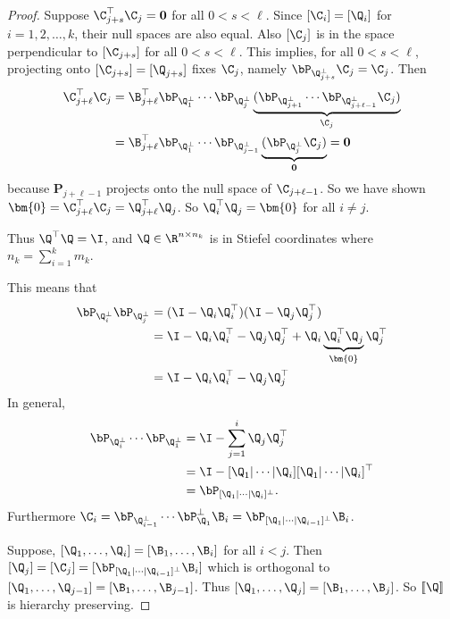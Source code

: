 \begin{proof}
        Suppose $\C_{j + s}^\top\C_j = \mathbf{0}$ for all $0 < s < \ell$. Since $[\C_i] = [\Q_i]$ for $i=1,2,\dots,k$, their null spaces are also equal. Also $[\C_j]$ is in the space perpendicular to $[\C_{j + s}]$ for all $0 < s < \ell$. This implies, for all $0 < s < \ell$, projecting onto $[\C_{j+s}] = [\Q_{j+s}]$ fixes $\C_j$, namely $\bP_{\Q_{j+s}^\perp}\C_j = \C_j$. Then
        \begin{align}
            \C_{j + \ell}^\top\C_j &= \B_{j + \ell}^\top\bP_{\Q_1^\perp} \cdots \bP_{\Q_j^\perp} \underbrace{(\bP_{\Q_{j+1}^\perp} \cdots \bP_{\Q_{j+\ell-1}^\perp}\C_j)}_{\C_j}\\
            &= \B_{j + \ell}^\top\bP_{\Q_1^\perp} \cdots \bP_{\Q_{j-1}^\perp}\underbrace{(\bP_{\Q_j^\perp} \C_j)}_{\mathbf{0}} = \mathbf{0}
        \end{align}
        because $\mathbf{P}_{j+\ell -1}$ projects onto the null space of $\C_{j+\ell - 1}$. So we have shown $\bm{0} = \C_{j + \ell}^\top\C_j = \Q_{j + \ell}^\top\Q_j$. So $\Q_i^\top \Q_j = \bm{0}$ for all $i \neq j$.


        Thus $\Q^\top \Q = \I$, and $\Q\in \R^{n \times n_k}$ is in Stiefel coordinates where $n_k = \sum_{i=1}^k m_k$. 

        This means that 
        \begin{align*}
            \bP_{\Q_i^\perp} \bP_{\Q_j^\perp} &= (\I - \Q_i \Q_i^\top)(\I - \Q_j \Q_j^\top) \\
                                            &= \I - \Q_i \Q_i^\top - \Q_j \Q_j^\top +  \Q_i \underbrace{\Q_i^\top\Q_j}_{\bm{0}} \Q_j^\top\\
                                            &= \I - \Q_i \Q_i^\top - \Q_j \Q_j^\top\\
        \end{align*}
        In general,
        \begin{align*}
            \bP_{\Q_i^\perp} \cdots \bP_{\Q_1^\perp} &= \I - \sum_{j=1}^i \Q_j \Q_j^\top \\
            &= \I - [\Q_1|\cdots|\Q_i] [\Q_1|\cdots|\Q_i]^\top \\
            &= \bP_{[\Q_1|\cdots|\Q_i]^\perp}.
        \end{align*}
        Furthermore
        $\C_i = \bP_{\Q_{i-1}^\perp} \cdots \bP_{\Q_1}^\perp\B_i = \bP_{[\Q_1|\cdots|\Q_{i-1}]^\perp}\B_i$.

        Suppose, $[\Q_1,\dots,\Q_i] = [\B_1,\dots, \B_i]$ for all $i<j$. Then
        $[\Q_j] = [\C_j] = [\bP_{[\Q_1|\cdots|\Q_{i-1}]^\perp}\B_i]$ which is orthogonal to $[\Q_1,\dots,\Q_{j-1}] = [\B_1,\dots, \B_{j-1}]$. Thus $[\Q_1,\dots,\Q_j] = [\B_1,\dots, \B_j]$. So $[\![\Q]\!]$ is hierarchy preserving.


\end{proof}
